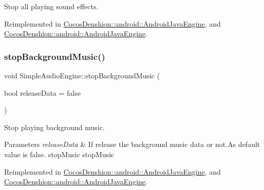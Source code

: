 Stop all playing sound effects. 

Reimplemented in \hyperlink{classCocosDenshion_1_1android_1_1AndroidJavaEngine_a799f2f5d4f50aacfd975e5983f46bbed}{Cocos\+Denshion\+::android\+::\+Android\+Java\+Engine}, and \hyperlink{classCocosDenshion_1_1android_1_1AndroidJavaEngine_a38d6736750cc2832b9a5dea632f293b6}{Cocos\+Denshion\+::android\+::\+Android\+Java\+Engine}.

\mbox{\label{classCocosDenshion_1_1SimpleAudioEngine_a3c67d3e233924b25d67bc198aaa4553c}} 
\subsubsection{\texorpdfstring{stop\+Background\+Music()}{stopBackgroundMusic()}\hspace{0.1cm}{\footnotesize\ttfamily [1/2]}}
{\footnotesize\ttfamily void Simple\+Audio\+Engine\+::stop\+Background\+Music (\begin{DoxyParamCaption}\item[{bool}]{release\+Data = {\ttfamily false} }\end{DoxyParamCaption})\hspace{0.3cm}{\ttfamily [virtual]}}

Stop playing background music.


\begin{DoxyParams}{Parameters}
{\em release\+Data} & If release the background music data or not.\+As default value is false.  stop\+Music  stop\+Music \\
\hline
\end{DoxyParams}


Reimplemented in \hyperlink{classCocosDenshion_1_1android_1_1AndroidJavaEngine_af9a747a87ff0744c9de7f76208637e0c}{Cocos\+Denshion\+::android\+::\+Android\+Java\+Engine}, and \hyperlink{classCocosDenshion_1_1android_1_1AndroidJavaEngine_a736969e835ddb130f9f25976af4ed94f}{Cocos\+Denshion\+::android\+::\+Android\+Java\+Engine}.

\mbox{\label{classCocosDenshion_1_1SimpleAudioEngine_ad922d9d678ab53e92509d2dc7c1ea0f2}} 
